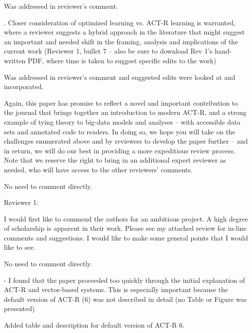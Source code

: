 \documentclass[answers,12pt]{exam}
\begin{document}
\begin{questions}
\begin{solution}
Was addressed in reviewer's comment.
\end{solution}

. Closer consideration of optimized learning vs. ACT-R learning is warranted, where a reviewer suggests a hybrid approach in the literature that might suggest an important and needed shift in the framing, analysis and implications of the current work (Reviewer 1, bullet 7 -- also be sure to download Rev 1's hand-written PDF, where time is taken to suggest specific edits to the work)

\begin{solution}
Was addressed in reviewer's comment and suggested edits were looked at and incorporated.
\end{solution}

\question Again, this paper has promise to reflect a novel and important contribution to the journal that brings together an introduction to modern ACT-R, and a strong example of tying theory to big-data models and analyses -- with accessible data sets and annotated code to readers. In doing so, we hope you will take on the challenges enumerated above and by reviewers to develop the paper further -- and in return, we will do our best in providing a more expeditious review process. Note that we reserve the right to bring in an additional expert reviewer as needed, who will have access to the other reviewers' comments.

\begin{solution}
No need to comment directly.
\end{solution}


Reviewer 1: 

\question I would first like to commend the authors for an ambitious project. A high degree of scholarship is apparent in their work. Please see my attached review for in-line comments and suggestions. I would like to make some general points that I would like to see.

\begin{solution}
No need to comment directly.
\end{solution}

\question - I found that the paper proceeded too quickly through the initial explanation of ACT-R and vector-based systems. This is especially important because the default version of ACT-R (6) was not described in detail (no Table or Figure was presented)

\begin{solution}
Added table and description for default version of ACT-R 6.


\end{solution}
\end{questions}
\end{document}
